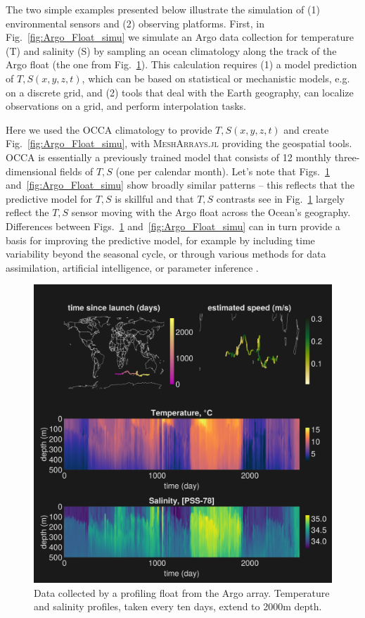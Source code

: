 \documentclass{juliacon}[12pt]
\newcommand{\pkg}[1]{{\small \textsc{#1}}}
\begin{document}
The two simple examples presented below illustrate the simulation of (1) environmental sensors and (2) observing platforms. First, in Fig.~\ref{fig:Argo_Float_simu} we simulate an Argo data collection for temperature (T) and salinity (S) by sampling an ocean climatology along the track of the Argo float (the one from Fig.~\ref{fig:Argo_Float}). This calculation requires (1) a model prediction of $T,S(x,y,z,t)$, which can be based on statistical or mechanistic models, e.g. on a discrete grid, and (2) tools that deal with the Earth geography, can localize observations on a grid, and perform interpolation tasks. 

Here we used the OCCA climatology \cite{Forget2010} to provide $T,S(x,y,z,t)$ and create Fig.~\ref{fig:Argo_Float_simu}, with \pkg{MeshArrays.jl} providing the geospatial tools. OCCA is essentially a previously trained model that consists of 12 monthly three-dimensional fields of $T,S$ (one per calendar month). Let's note that Figs.~\ref{fig:Argo_Float} and~\ref{fig:Argo_Float_simu} show broadly similar patterns -- this reflects that the predictive model for $T,S$ is skillful and that $T,S$ contrasts see in Fig.~\ref{fig:Argo_Float} largely reflect the $T,S$ sensor moving with the Argo float across the Ocean's geography. Differences between Figs.~\ref{fig:Argo_Float} and~\ref{fig:Argo_Float_simu} can in turn provide a basis for improving the predictive model, for example by including time variability beyond the seasonal cycle, or through various methods for data assimilation, artificial intelligence, or parameter inference \cite{Forget2010,Forget2015a,FFL15,FP15,Forget2024b}.

\begin{figure}[t]
\centerline{\includegraphics[width=\columnwidth]{figs/20240528_Argo_6900900.png}}
\caption{Data collected by a profiling float from the Argo array. Temperature and salinity profiles, taken every ten days, extend to 2000m depth.}
\label{fig:Argo_Float}
\end{figure}
\end{document}
